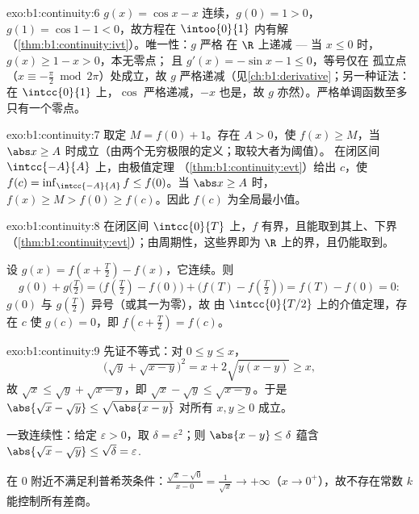 \begin{solution}{exo:b1:continuity:6}
$g(x) = \cos x - x$ 连续，$g(0) = 1 > 0$，$g(1) = \cos 1 -
1 < 0$，故方程在 $\intoo{0}{1}$ 内有解
（\cref{thm:b1:continuity:ivt}）。唯一性：$g$ 严格
在 $\R$ 上递减 --- 当 $x \leq 0$ 时，$g(x) \geq 1 - x > 0$，本无零点；
且 $g'(x) = -\sin x - 1 \leq 0$，等号仅在
孤立点（$x \equiv -\frac\pi2 \bmod 2\pi$）处成立，故 $g$
严格递减（见\cref{ch:b1:derivative}；另一种证法：在
$\intcc{0}{1}$ 上，$\cos$ 严格递减，$-x$ 也是，故 $g$
亦然）。严格单调函数至多只有一个零点。
\end{solution}

\begin{solution}{exo:b1:continuity:7}
取定 $M = f(0) + 1$。存在 $A > 0$，使 $f(x) \geq M$，当 $\abs x
\geq A$ 时成立（由两个无穷极限的定义；取较大者为阈值）。
在闭区间 $\intcc{-A}{A}$ 上，由极值定理
（\cref{thm:b1:continuity:evt}）给出 $c$，使 $f(c) =
\inf_{\intcc{-A}{A}} f \leq f(0)$。当 $\abs x \geq A$ 时，$f(x) \geq M
> f(0) \geq f(c)$。因此 $f(c)$ 为全局最小值。
\end{solution}

\begin{solution}{exo:b1:continuity:8}
在闭区间 $\intcc{0}{T}$ 上，$f$ 有界，且能取到其上、下界
（\cref{thm:b1:continuity:evt}）；由周期性，这些界即为
$\R$ 上的界，且仍能取到。

设 $g(x) = f(x + \frac T2) - f(x)$，它连续。则
\[
g(0) + g\bigl(\tfrac T2\bigr)
= \bigl(f(\tfrac T2) - f(0)\bigr) + \bigl(f(T) - f(\tfrac T2)\bigr)
= f(T) - f(0) = 0 :
\]
$g(0)$ 与 $g(\frac T2)$ 异号（或其一为零），故
由 $\intcc{0}{T/2}$ 上的介值定理，存在 $c$ 使
$g(c) = 0$，即 $f(c + \frac T2) = f(c)$。
\end{solution}

\begin{solution}{exo:b1:continuity:9}
先证不等式：对 $0 \leq y \leq x$，
\[
\bigl(\sqrt y + \sqrt{x - y}\bigr)^2 = x + 2\sqrt{y(x-y)} \geq x,
\]
故 $\sqrt x \leq \sqrt y + \sqrt{x - y}$，即 $\sqrt x - \sqrt y
\leq \sqrt{x - y}$。于是 $\abs{\sqrt x - \sqrt y} \leq
\sqrt{\abs{x - y}}$ 对所有 $x, y \geq 0$ 成立。

一致连续性：给定 $\varepsilon > 0$，取 $\delta =
\varepsilon^2$；则 $\abs{x - y} \leq \delta$ 蕴含 $\abs{\sqrt x
- \sqrt y} \leq \sqrt\delta = \varepsilon$.

在 $0$ 附近不满足利普希茨条件：$\frac{\sqrt x - \sqrt 0}{x - 0} =
\frac{1}{\sqrt x} \to +\infty$（$x \to 0^+$），故不存在常数 $k$
能控制所有差商。
\end{solution}

